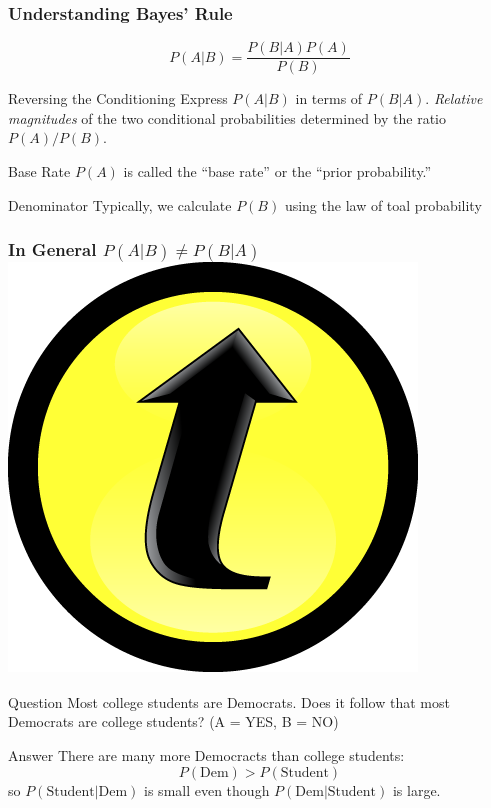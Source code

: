\documentclass[handout]{beamer}
\begin{document}
\begin{frame}
\frametitle{Understanding Bayes' Rule}
$$\boxed{P(A|B) = \frac{P(B|A)P(A)}{P(B)}}$$\pause

\begin{block}
	{Reversing the Conditioning}
	Express $P(A|B)$ in terms of $P(B|A)$. \emph{Relative magnitudes} of the two conditional probabilities determined by the ratio $P(A)/P(B)$.
\end{block}

\begin{block}
	{Base Rate}
	$P(A)$ is called the ``base rate'' or the ``prior probability.'' 
\end{block}

\begin{block}
	{Denominator}
	Typically, we calculate $P(B)$ using the law of toal probability
\end{block}


\end{frame}
\begin{frame}
\frametitle{In General $P(A|B) \neq P(B|A)$ \hfill \includegraphics[scale = 0.05]{./images/clicker}} 
\begin{block}{Question}
Most college students are Democrats. Does it follow that most Democrats are college students?  \hfill  \alert{(A = YES, B = NO)}
\end{block}

\pause

\begin{block}{Answer}
There are many more Democracts than college students: 
$$P(\mbox{Dem}) > P(\mbox{Student})$$ 
so $P(\mbox{Student}|\mbox{Dem})$ is small even though $P(\mbox{Dem}|\mbox{Student})$ is large.
\end{block}
\end{frame}
\end{document}
